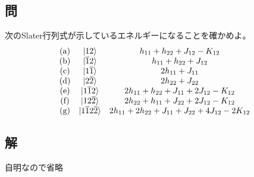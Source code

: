 \subsection{問}
次のSlater行列式が示しているエネルギーになることを確かめよ。
\begin{align}
	\begin{array}{>{\rm}ccc}
		(a) &
		\ket{\aorb{1}\aorb{2}} &
		h_{11} +h_{22} +J_{12} -K_{12} \\
		(b) &
		\ket{\borb{1}\aorb{2}} &
		h_{11} +h_{22} +J_{12} \\
		(c) &
		\ket{\aorb{1}\borb{1}} &
		2h_{11} +J_{11} \\
		(d) &
		\ket{\aorb{2}\borb{2}} &
		2h_{22} +J_{22} \\
		(e) &
		\ket{\aorb{1}\borb{1}\aorb{2}} &
		2h_{11} +h_{22} +J_{11} +2J_{12} -K_{12} \\
		(f) &
		\ket{\aorb{1}\aorb{2}\borb{2}} &
		2h_{22} +h_{11} +J_{22} +2J_{12} -K_{12} \\
		(g) &
		\ket{\aorb{1}\borb{1}\aorb{2}\borb{2}} &
		2h_{11} +2h_{22} +J_{11} +J_{22} +4J_{12} -2K_{12}
	\end{array}
	\nonumber
\end{align}

\subsection{解}
自明なので省略
